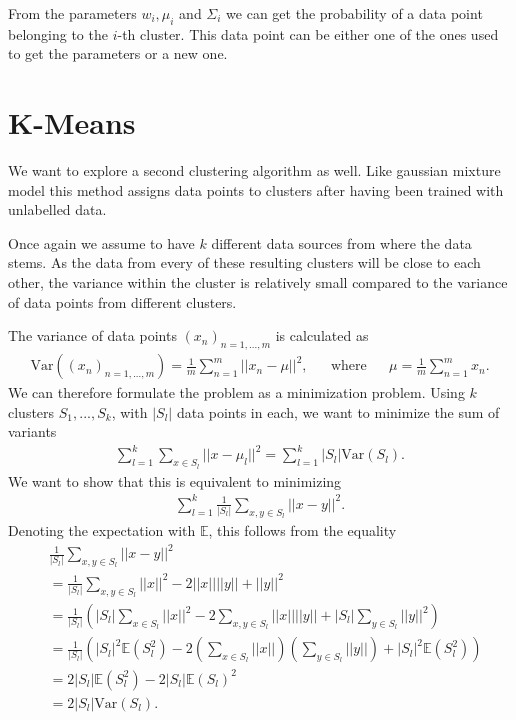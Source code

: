 From the parameters $w_i, \mu_i$ and $\Sigma_i$ we can get the probability of a data point belonging to the $i$-th cluster. This data point can be either one of the ones used to get the parameters or a new one.

\section{K-Means}

We want to explore a second clustering algorithm as well. Like gaussian mixture model this method assigns data points to clusters after having been trained with unlabelled data.

Once again we assume to have $k$ different data sources from where the data stems. As the data from every of these resulting clusters will be close to each other, the variance within the cluster is relatively small compared to the variance of data points from different clusters.

The variance of data points $(x_n)_{n=1, ..., m}$ is calculated as
\begin{align*}
	\text{Var}((x_n)_{n=1, ..., m}) = \frac{1}{m} \sum_{n=1}^{m} ||x_n - \mu||^2, && \text{where} && \mu = \frac{1}{m} \sum_{n=1}^{m} x_n.
\end{align*}
We can therefore formulate the problem as a minimization problem. Using $k$ clusters $S_1, ..., S_k$, with $|S_l|$ data points in each, we want to minimize the sum of variants
\begin{align*}
	\sum_{l=1}^{k} \sum_{x \in S_l} ||x - \mu_l||^2 = \sum_{l=1}^{k} |S_l| \text{Var}(S_l).
\end{align*}
We want to show that this is equivalent to minimizing
\begin{align*}
	\sum_{l=1}^{k} \frac{1}{|S_l|} \sum_{x, y \in S_l} ||x-y||^2.
\end{align*}
Denoting the expectation with $\mathds{E}$, this follows from the equality
\begin{align*}
	&\frac{1}{|S_l|} \sum_{x, y \in S_l} ||x-y||^2\\
	&= \frac{1}{|S_l|} \sum_{x, y \in S_l} ||x||^2 - 2||x|| ||y|| + ||y||^2\\
	&= \frac{1}{|S_l|} \left(|S_l| \sum_{x\in S_l} ||x||^2 - 2\sum_{x, y \in S_l}||x|| ||y|| + |S_l| \sum_{y \in S_l}||y||^2\right)\\
	&= \frac{1}{|S_l|} (|S_l|^2 \mathds{E}(S_l^2) - 2\left(\sum_{x\in S_l}||x||\right)\left(\sum_{y \in S_l}||y||\right) + |S_l|^2 \mathds{E}(S_l^2))\\
	&= 2|S_l| \mathds{E}(S_l^2) - 2|S_l| \mathds{E}(S_l)^2\\
	&= 2 |S_l| \text{Var}(S_l).
\end{align*}

